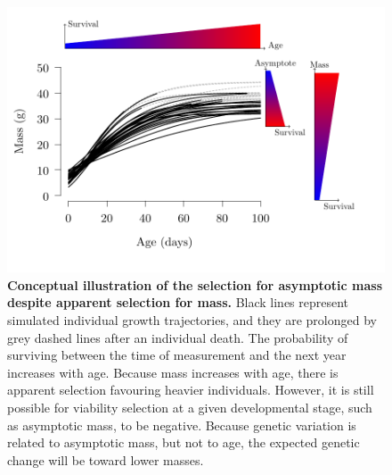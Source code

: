 \begin{figure}[ht]
\centering
\includegraphics[width=\textwidth]{FiguresStasis/schemeSelectionAM}
\caption{\footnotesize \textbf{Conceptual illustration of the selection for asymptotic mass despite apparent selection for mass.} Black lines represent simulated individual growth trajectories, and they are prolonged by grey dashed lines after an individual death. The probability of surviving between the time of measurement and the next year increases with age. Because mass increases with age, there is apparent selection favouring heavier individuals. However, it is still possible for viability selection at a given developmental stage, such as asymptotic mass, to be negative. Because genetic variation is related to asymptotic mass, but not to age, the expected genetic change will be toward lower masses.}
\label{fig:scheme}
\end{figure}
